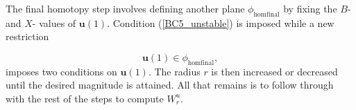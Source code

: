 \documentclass{ws-ijbc}
\begin{document}
The final homotopy step involves defining another plane $\phi_{\mathrm{homfinal}}$ by fixing the $B$- and $X$- values of $\mathbf{u}(1)$.  Condition (\ref{BC5_unstable}) is imposed while a new restriction

\begin{equation}
\mathbf{u}(1) \in \phi_{\mathrm{homfinal}},
\label{BC9_unstable}
\end{equation}
\noindent
imposes two conditions on $\mathbf{u}(1)$.  The radius $r$ is then increased or decreased until the desired magnitude is attained.  All that remains is to follow through with the rest of the steps to compute $W^u_r$.


\newpage

\end{document}
